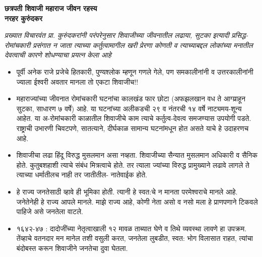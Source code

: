 \begin{center}
     \Large{\textbf{छत्रपती शिवाजी महाराज जीवन रहस्य \\ नरहर कुरुंदकर}}  %
\end{center}

{\em प्रख्यात विचारवंत प्रा. कुरुंदकरांनी परंपरेनुसार शिवाजीच्या जीवनातील लढाया, सुटका इत्यादी प्रसिद्ध-रोमांचकारी प्रसंगात न जाता त्याच्या कर्तुत्वामागील खरी प्रेरणा कोणती व त्याच्याबद्दल लोकांच्या मनातील देवत्वाची कारणे शोधण्याचा प्रयत्न केला आहे}

\bigskip

\begin{itemize}[noitemsep,nolistsep]

\item पूर्वी अनेक राजे प्रजेचे हितकारी, पुण्यश्लोक म्हणून गणले गेले, पण समकालीनांनी व उत्तरकालीनांनी ज्याला ईश्वरी अवतार मानला तो एकटा शिवाजीच!!

\item महाराज्यांच्या जीवनात रोमांचकारी घटनांचा कालखंड फार छोटा (अफझलखान वध ते आग्य्राहून सुटका, साधारण ७ वर्षे) आहे. या घटनांच्या अलीकडची २९ व नंतरची १४ वर्षे नाट्यमय-शून्य आहेत. या अ-रोमांचकारी काळातील शिवाजीचे काम त्याचे कर्तुत्व-देवत्व समजण्यास उपयोगी पडते. राष्ट्राची उभारणी चिवटपणे, सातत्याने, दीर्घकाळ सामान्य घटनांमधून होत असते याचे हे उदाहरणच आहे.

\item शिवाजीचा लढा हिंदू विरुद्ध मुसलमान असा नव्हता. शिवाजीच्या सैन्यात मुसलमान अधिकारी व सैनिक होते. कुतुबशहाशी त्याचे संबंध मित्रत्वाचे होते. तर त्याला ज्यांच्या विरुद्ध प्रामुख्याने लढावे लागले ते त्याच्या धर्मातीलच नाही तर जातीतील- नातेवाईक होते. 

\item हे राज्य जनतेसाठी व्हावे ही भूमिका होती. त्यानी हे स्वत:चे न मानता परमेश्वराचे मानले आहे. जनेतेनेही हे राज्य आपले मानले. माझे राज्य आहे, कोणी नेता असो व नसो मला हे प्राणपणाने टिकवले पाहिजे असे जनतेला वाटले.

\item १६४२-४७ : दादोजींच्या नेतृत्वाखाली १२ मावळ ताब्यात घेणे व तिथे व्यवस्था लावणे हा उपक्रम. तेंव्हाचे वतनदार मन मानेल तशी वसुली करत, जनतेला लुबडीत, स्वत: भोग विलासात राहत, त्यांचा बंदोबस्त करून शिवाजीने जनतेचा दुवा घेतला.


\end{itemize}
